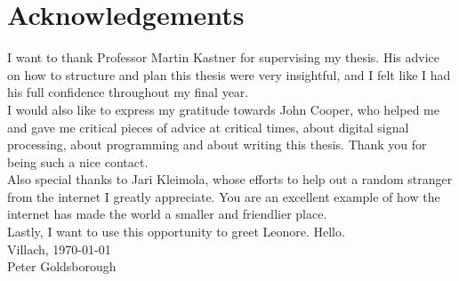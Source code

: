 \chapter*{Acknowledgements}

I want to thank Professor Martin Kastner for supervising my thesis. His advice on how to structure and plan this thesis were very insightful, and I felt like I had his full confidence throughout my final year.\\

\noindent I would also like to express my gratitude towards John Cooper, who helped me and gave me critical pieces of advice at critical times, about digital signal processing, about programming and about writing this thesis. Thank you for being such a nice contact.\\

\noindent Also special thanks to Jari Kleimola, whose efforts to help out a random stranger from the internet I greatly appreciate. You are an excellent example of how the internet has made the world a smaller and friendlier place. \\

\noindent Lastly, I want to use this opportunity to greet Leonore. Hello. \\

\noindent Villach, \today \\

\noindent Peter Goldsborough
